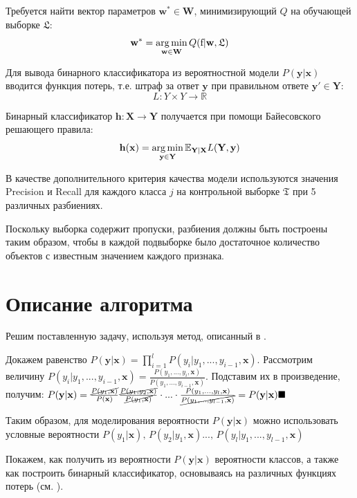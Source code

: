 \documentclass[12pt,twoside]{article}
\newcommand{\x}{\mathbf{x}}
\newcommand{\h}{\mathbf{h}}
\newcommand{\w}{\mathbf{w}}
\newcommand{\W}{\mathbf{W}}
\newcommand{\y}{\mathbf{y}}
\newcommand{\X}{\mathbf{X}}
\newcommand{\Y}{\mathbf{Y}}
\newcommand{\fs}{\mbox{f}}
\begin{document}
%

Требуется найти вектор параметров $\w^*\in\W$, минимизирующий $Q$ на обучающей выборке $\mathfrak{L}$:
	$$\w^*=\argmin_{\w\in\W}Q(\fs|\w,\mathfrak{L})$$

Для вывода бинарного классификатора из вероятностной модели $P(\y|\x)$ вводится функция потерь, т.е. штраф за ответ $\y$ при правильном ответе $\y'\in\Y$:
$$L\colon Y\times Y\to \mathbb{R}$$

Бинарный классификатор $\h\colon\X\to\Y$ получается \cite{weiwei2010} при помощи Байесовского решающего правила:
$$\h(\x)=\argmin\limits_{\y\in\Y}\mathbb{E}_{\Y|\X}L(\Y,\y)$$

В качестве дополнительного критерия качества модели используются значения Precision и Recall для каждого класса $j$ на контрольной выборке $\mathfrak{T}$ при 5 различных разбиениях.


Поскольку выборка содержит пропуски, разбиения должны быть построены таким образом, чтобы в каждой подвыборке было достаточное количество объектов с известным значением каждого признака.

\section{Описание алгоритма}
Решим поставленную задачу, используя метод, описанный в \cite{weiwei2010}.

Докажем равенство $P(\y|\x)=\prod_{i=1}^lP(y_i|y_1,...,y_{i-1}, \x)$. Рассмотрим величину $P(y_i|y_1,...,y_{i-1},\x)=\frac{P(y_1,...,y_i,\x)}{P(y_1,...,y_{i-1},\x)}$. Подставим их в произведение, получим: $P(\y|\x)=\frac{\cancel{P(y_1,\x)}}{P(\x)}\frac{\cancel{P(y_1,y_2,\x)}}{\cancel{P(y_1,\x)}}\cdot...\cdot\frac{P(y_1,...,y_l,\x)}{\cancel{P(y_1,...,y_{l-1},\x)}}=P(\y|\x) \blacksquare$

Таким образом, для моделирования вероятности $P(\y|\x)$ можно использовать условные вероятности $P(y_1|\x),\,P(y_2|y_1,\x)...,\,P(y_l|y_1,...,y_{l-1},\x)$

Покажем, как получить из вероятности $P(\y|\x)$ вероятности классов, а также как построить бинарный классификатор, основываясь на различных функциях потерь (см. \cite{weiwei2010}).
\end{document}
